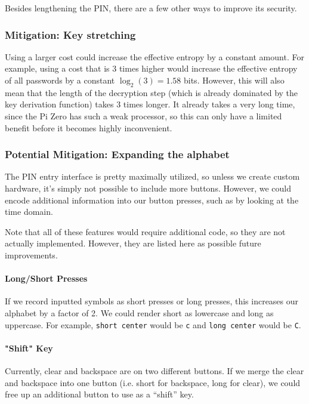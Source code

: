 \documentclass{article}
\begin{document}
Besides lengthening the PIN, there are a few other ways to improve its security.

\subsubsection{Mitigation: Key stretching}

Using a larger cost could increase the effective entropy by a constant amount. For example, using a cost that is 3 times higher would increase the effective entropy of all passwords by a constant $\log_2(3) = 1.58$ bits. However, this will also mean that the length of the decryption step (which is already dominated by the key derivation function) takes 3 times longer. It already takes a very long time, since the Pi Zero has such a weak processor, so this can only have a limited benefit before it becomes highly inconvenient.

\subsubsection{Potential Mitigation: Expanding the alphabet}

The PIN entry interface is pretty maximally utilized, so unless we create custom hardware, it's simply not possible to include more buttons. However, we could encode additional information into our button presses, such as by looking at the time domain.

Note that all of these features would require additional code, so they are not actually implemented. However, they are listed here as possible future improvements.

\paragraph{Long/Short Presses} If we record inputted symbols as short presses or long presses, this increases our alphabet by a factor of 2. We could render short as lowercase and long as uppercase. For example, \texttt{short center} would be \texttt{c} and \texttt{long center} would be \texttt{C}.

\paragraph{"Shift" Key} Currently, clear and backspace are on two different buttons. If we merge the clear and backspace into one button (i.e. short for backspace, long for clear), we could free up an additional button to use as a ``shift'' key.
\end{document}
